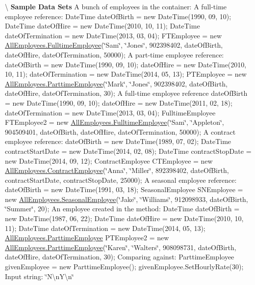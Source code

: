\textbackslash{} {\bfseries  Sample Data Sets} A bunch of employees in the container\+: A full-\/time employee reference\+: Date\+Time date\+Of\+Birth = new Date\+Time(1990, 09, 10); Date\+Time date\+Of\+Hire = new Date\+Time(2010, 10, 11); Date\+Time date\+Of\+Termination = new Date\+Time(2013, 03, 04); F\+T\+Employee = new \hyperlink{class_all_employees_1_1_fulltime_employee}{All\+Employees.\+Fulltime\+Employee}(\char`\"{}\+Sam\char`\"{}, \char`\"{}\+Jones\char`\"{}, 902398402, date\+Of\+Birth, date\+Of\+Hire, date\+Of\+Termination, 50000); A part-\/time employee reference\+: date\+Of\+Birth = new Date\+Time(1990, 09, 10); date\+Of\+Hire = new Date\+Time(2010, 10, 11); date\+Of\+Termination = new Date\+Time(2014, 05, 13); P\+T\+Employee = new \hyperlink{class_all_employees_1_1_parttime_employee}{All\+Employees.\+Parttime\+Employee}(\char`\"{}\+Mark\char`\"{}, \char`\"{}\+Jones\char`\"{}, 902398402, date\+Of\+Birth, date\+Of\+Hire, date\+Of\+Termination, 30); A full-\/time employee reference date\+Of\+Birth = new Date\+Time(1990, 09, 10); date\+Of\+Hire = new Date\+Time(2011, 02, 18); date\+Of\+Termination = new Date\+Time(2013, 03, 04); Fulltime\+Employee F\+T\+Employee2 = new \hyperlink{class_all_employees_1_1_fulltime_employee}{All\+Employees.\+Fulltime\+Employee}(\char`\"{}\+Sam\char`\"{}, \char`\"{}\+Appleton\char`\"{}, 904509401, date\+Of\+Birth, date\+Of\+Hire, date\+Of\+Termination, 50000); A contract employee reference\+: date\+Of\+Birth = new Date\+Time(1989, 07, 02); Date\+Time contract\+Start\+Date = new Date\+Time(2014, 02, 08); Date\+Time contract\+Stop\+Date = new Date\+Time(2014, 09, 12); Contract\+Employee C\+T\+Employee = new \hyperlink{class_all_employees_1_1_contract_employee}{All\+Employees.\+Contract\+Employee}(\char`\"{}\+Anna\char`\"{}, \char`\"{}\+Miller\char`\"{}, 892398402, date\+Of\+Birth, contract\+Start\+Date, contract\+Stop\+Date, 25000); A seasonal employee reference\+: date\+Of\+Birth = new Date\+Time(1991, 03, 18); Seasonal\+Employee S\+N\+Employee = new \hyperlink{class_all_employees_1_1_seasonal_employee}{All\+Employees.\+Seasonal\+Employee}(\char`\"{}\+Jake\char`\"{}, \char`\"{}\+Williams\char`\"{}, 912098933, date\+Of\+Birth, \char`\"{}\+Summer\char`\"{}, 20); An employee created in the method\+: Date\+Time date\+Of\+Birth = new Date\+Time(1987, 06, 22); Date\+Time date\+Of\+Hire = new Date\+Time(2010, 10, 11); Date\+Time date\+Of\+Termination = new Date\+Time(2014, 05, 13); \hyperlink{class_all_employees_1_1_parttime_employee}{All\+Employees.\+Parttime\+Employee} P\+T\+Employee2 = new \hyperlink{class_all_employees_1_1_parttime_employee}{All\+Employees.\+Parttime\+Employee}(\char`\"{}\+Karen\char`\"{}, \char`\"{}\+Walters\char`\"{}, 908098731, date\+Of\+Birth, date\+Of\+Hire, date\+Of\+Termination, 30); Comparing against\+: Parttime\+Employee given\+Employee = new Parttime\+Employee(); given\+Employee.\+Set\+Hourly\+Rate(30); Input string\+: \char`\"{}\+N\textbackslash{}n\+Y\textbackslash{}n\char`\"{}

